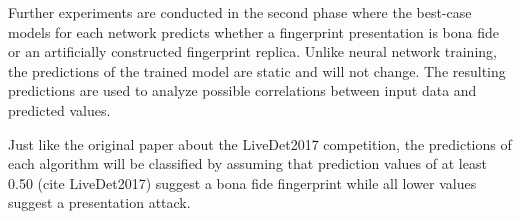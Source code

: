 Further experiments are conducted in the second phase where the best-case models for each network predicts whether a fingerprint presentation is bona fide or an artificially constructed fingerprint replica.
Unlike neural network training, the predictions of the trained model are static and will not change.
The resulting predictions are used to analyze possible correlations between input data and predicted values.

Just like the original paper about the LiveDet2017 competition, the predictions of each algorithm will be classified by assuming that prediction values of at least 0.50 (cite LiveDet2017) suggest a bona fide fingerprint while all lower values suggest a presentation attack.
